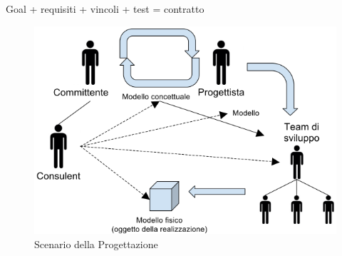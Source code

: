 Goal + requisiti + vincoli + test = contratto

\begin{center}
\begin{figure}[H]
\centering
\includegraphics[scale=1]{figures/mdlng2.png}
\caption{Scenario della Progettazione} 
\end{figure}
\end{center}

